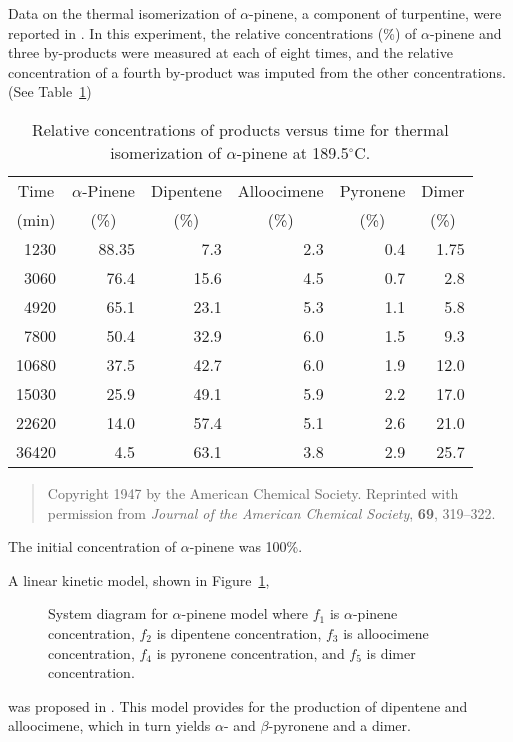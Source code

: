 Data on the thermal isomerization of
$\alpha$-pinene, a component of turpentine,
were reported in .
In this experiment, the relative concentrations (\%) of
$\alpha$-pinene
and three by-products were measured at each of eight times,
and the relative concentration of a fourth by-product was imputed
from the other concentrations.
(See Table~\ref{atbl:bhme})
\begin{table}
  \caption{\label{atbl:bhme}
  Relative concentrations of products versus time for thermal
  isomerization of $\alpha$-pinene at 189.5$^\circ$C.}
  \begin{center}
    \begin{tabular}{r r r r r r}\hline
      \multicolumn{1}{c}{Time}&\multicolumn{1}{c}{$\alpha$-Pinene}&
      \multicolumn{1}{c}{Dipentene}&\multicolumn{1}{c}{Alloocimene}&
      \multicolumn{1}{c}{Pyronene}&\multicolumn{1}{c}{Dimer}\\
      \multicolumn{1}{c}{(min)}&\multicolumn{1}{c}{(\%)}&\multicolumn{1}{c}{(\%)}&
      \multicolumn{1}{c}{(\%)}&\multicolumn{1}{c}{(\%)}&\multicolumn{1}{c}{(\%)}\\
      \hline
      1230&88.35&7.3&2.3&0.4&1.75\\
      3060&76.4&15.6&4.5&0.7&2.8\\
      4920&65.1&23.1&5.3&1.1&5.8\\
      7800&50.4&32.9&6.0&1.5&9.3\\
      10680&37.5&42.7&6.0&1.9&12.0\\
      15030&25.9&49.1&5.9&2.2&17.0\\
      22620&14.0&57.4&5.1&2.6&21.0\\
      36420&4.5&63.1&3.8&2.9&25.7\\
      \hline
    \end{tabular}
  \end{center}
\begin{quote}\small
  Copyright 1947 by the American Chemical Society.  Reprinted with
  permission from {\em Journal of the American Chemical Society},
  {\bf 69}, 319--322.
\end{quote}
\end{table}
The initial concentration of $\alpha$-pinene was 100\%.

A linear kinetic model, shown in Figure~\ref{fig:pinene},

\begin{figure}
  \centerline{\box\graph}
  \caption{\label{fig:pinene}
  System diagram for $\alpha$-pinene model where $f_{1}$ is
  $\alpha$-pinene concentration, $f_{2}$ is dipentene concentration,
  $f_{3}$ is alloocimene concentration, $f_{4}$ is pyronene
  concentration, and $f_{5}$ is dimer concentration.}
\end{figure}
was proposed in .
This model provides for the production of dipentene and alloocimene,
which in turn yields $\alpha$- and $\beta$-pyronene and a dimer.

